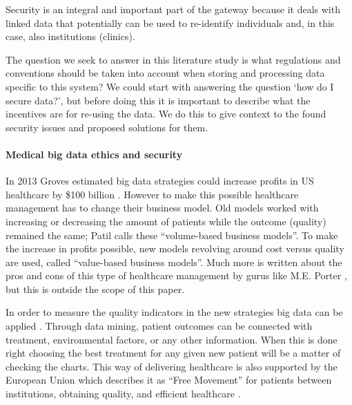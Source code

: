 


Security is an integral and important part of the \project{} gateway because it deals with linked data that potentially can be used to re-identify individuals and, in this case, also institutions (clinics).

The question we seek to answer in this literature study is what regulations and conventions should be taken into account when storing and processing data specific to this system?
We could start with answering the question `how do I secure data?', but before doing this it is important to describe what the incentives are for re-using the data.
We do this to give context to the found security issues and proposed solutions for them.


\paragraph{Medical big data ethics and security}
\label{security-ethics}

In 2013 Groves \cite{s20Groves2013} estimated big data strategies could increase profits in US healthcare by \$100 billion \cite{s13Patil2014}.
However to make this possible healthcare management has to change their business model.
Old models worked with increasing or decreasing the amount of patients while the outcome (quality) remained the same; Patil \cite{s13Patil2014} calls these ``volume-based business models''.
To make the increase in profits possible, new models revolving around cost versus quality are used, called ``value-based business models''.
Much more is written about the pros and cons of this type of healthcare management by gurus like M.E. Porter \cite{s21Porter2006}, but this is outside the scope of this paper.

In order to measure the quality indicators in the new strategies big data can be applied \cite{s6West2009}. 
Through data mining, patient outcomes can be connected with treatment, environmental factors, or any other information.
When this is done right choosing the best treatment for any given new patient will be a matter of checking the charts.
This way of delivering healthcare is also supported by the European Union which describes it as ``Free Movement'' for patients between institutions, obtaining quality, and efficient healthcare \cite{s8FernandezAleman2013}.

